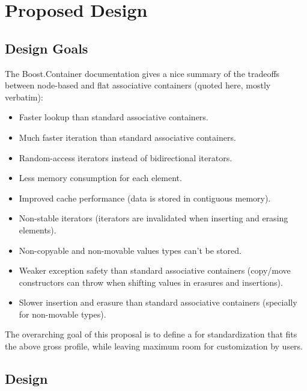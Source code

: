 \section{Proposed Design}

\subsection{Design Goals}

The Boost.Container documentation gives a nice summary of the tradeoffs
between node-based and flat associative containers (quoted here, mostly
verbatim):

\begin{itemize}
  \item Faster lookup than standard associative containers.

  \item Much faster iteration than standard associative
    containers.

  \item Random-access iterators instead of bidirectional iterators.

  \item Less memory consumption for each element.

  \item Improved cache performance (data is stored in contiguous memory).

  \item Non-stable iterators (iterators are invalidated when inserting and
    erasing elements).

  \item Non-copyable and non-movable values types can't be stored.

  \item Weaker exception safety than standard associative containers
    (copy/move constructors can throw when shifting values in erasures and
    insertions).

  \item Slower insertion and erasure than standard associative containers
    (specially for non-movable types).
\end{itemize}

The overarching goal of this proposal is to define a  for
standardization that fits the above gross profile, while leaving maximum room
for customization by users.

\subsection{Design}

